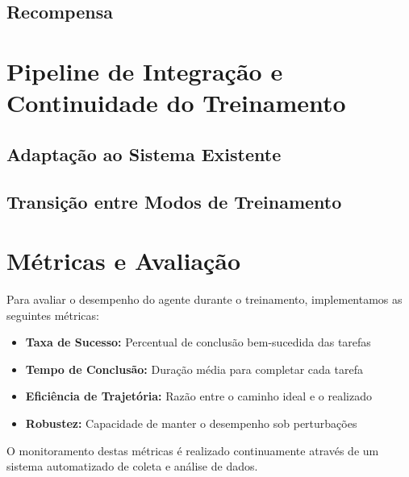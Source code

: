 \subsection{Recompensa}



\section{Pipeline de Integração e Continuidade do Treinamento}

\subsection{Adaptação ao Sistema Existente}

\subsection{Transição entre Modos de Treinamento}



\section{Métricas e Avaliação}

Para avaliar o desempenho do agente durante o treinamento, implementamos as seguintes métricas:

\begin{itemize}
    \item \textbf{Taxa de Sucesso:} Percentual de conclusão bem-sucedida das tarefas
    \item \textbf{Tempo de Conclusão:} Duração média para completar cada tarefa
    \item \textbf{Eficiência de Trajetória:} Razão entre o caminho ideal e o realizado
    \item \textbf{Robustez:} Capacidade de manter o desempenho sob perturbações
\end{itemize}

O monitoramento destas métricas é realizado continuamente através de um sistema automatizado de coleta e análise de dados.